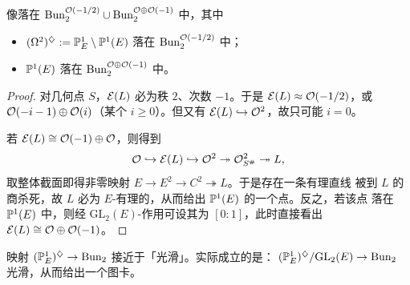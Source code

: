 \begin{proposition}
像落在 $\mathrm{Bun}_2^{\mathcal{O}(-1/2)}\cup\mathrm{Bun}_2^{\mathcal{O}\oplus\mathcal{O}(-1)}$ 中，其中
\begin{itemize}[itemsep=1pt,topsep=2pt]
\item $(\Omega^2)^{\diamondsuit}:=\mathbb{P}^1_E\setminus\mathbb{P}^1(E)$ 落在 $\mathrm{Bun}_2^{\mathcal{O}(-1/2)}$ 中；
\item $\mathbb{P}^1(E)$ 落在 $\mathrm{Bun}_2^{\mathcal{O}\oplus\mathcal{O}(-1)}$ 中。
\end{itemize}
\end{proposition}

\begin{proof}
对几何点 $S$，$\mathcal{E}(L)$ 必为秩 $2$、次数 $-1$。于是
$\mathcal{E}(L)\approx\mathcal{O}(-1/2)$，或 $\mathcal{O}(-i-1)\oplus\mathcal{O}(i)$（某个 $i\ge0$）。但又有
$\mathcal{E}(L)\hookrightarrow\mathcal{O}^2$，故只可能 $i=0$。

若 $\mathcal{E}(L)\cong\mathcal{O}(-1)\oplus\mathcal{O}$，则得到
\[
\mathcal{O}\hookrightarrow\mathcal{E}(L)\hookrightarrow\mathcal{O}^2\twoheadrightarrow
\mathcal{O}^2_{S^\#}\twoheadrightarrow L,
\]
取整体截面即得非零映射 $E\to E^2\to C^2\twoheadrightarrow L$。于是存在一条有理直线
被到 $L$ 的商杀死，故 $L$ 必为 $E$-有理的，从而给出 $\mathbb{P}^1(E)$ 的一个点。反之，若该点
落在 $\mathbb{P}^1(E)$ 中，则经 $\mathrm{GL}_2(E)$-作用可设其为 $[0:1]$，此时直接看出
$\mathcal{E}(L)\cong\mathcal{O}\oplus\mathcal{O}(-1)$。
\end{proof}

\begin{remark}
映射 $(\mathbb{P}^1_E)^{\diamondsuit}\to\mathrm{Bun}_2$ 接近于「光滑」。实际成立的是：
$(\mathbb{P}^1_E)^{\diamondsuit}/\mathrm{GL}_2(E)\to\mathrm{Bun}_2$ 光滑，从而给出一个图卡。
\end{remark}
